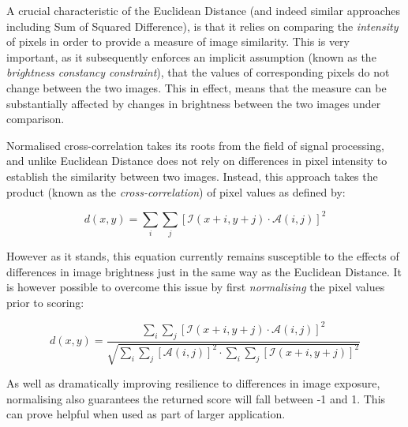 A crucial characteristic of the Euclidean Distance (and indeed similar approaches including Sum of Squared Difference), is that it relies on comparing the \textit{intensity} of pixels in order to provide a measure of image similarity. This is very important, as it subsequently enforces an implicit assumption (known as the \textit{brightness constancy constraint}), that the values of corresponding pixels do not change between the two images\cite{szeliski}. This in effect, means that the measure can be substantially affected by changes in brightness between the two images under comparison.  

Normalised cross-correlation takes its roots from the field of signal processing, and unlike Euclidean Distance does not rely on differences in pixel intensity to establish the similarity between two images. Instead, this approach takes the product (known as the \textit{cross-correlation}) of pixel values as defined by:

\begin{equation}
d(x, y) = \sum\limits_{i}\sum\limits_{j}[\mathcal{I}(x + i, y + j) \cdot \mathcal{A}(i, j)]^2
\end{equation}

However as it stands, this equation currently remains susceptible to the effects of differences in image brightness just in the same way as the Euclidean Distance. It is however possible to overcome this issue by first \textit{normalising} the pixel values prior to scoring: 

\begin{equation}
d(x, y) = \frac{\sum\limits_{i}\sum\limits_{j}[\mathcal{I}(x + i, y + j) \cdot \mathcal{A}(i, j)]^2}{\sqrt{\sum\limits_{i}\sum\limits_{j}[\mathcal{A}(i, j)]^2 \cdot \sum\limits_{i}\sum\limits_{j}[\mathcal{I}(x + i, y + j)]^2}}
\end{equation}

As well as dramatically improving resilience to differences in image exposure, normalising also guarantees the returned score will fall between -1 and 1. This can prove helpful when used as part of larger application.  

%
%

